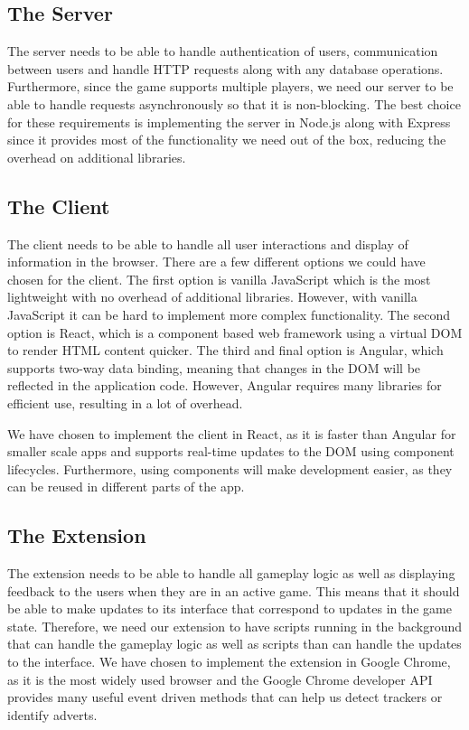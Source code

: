 \documentclass{l4proj}
\begin{document}
\subsection{The Server}
The server needs to be able to handle authentication of users, communication between users and handle HTTP requests along with any database operations. Furthermore, since the game supports multiple players, we need
our server to be able to handle requests asynchronously so that it is non-blocking. The best choice for these requirements is implementing the server in Node.js along with Express since it provides most of the functionality we need out of the box, reducing the overhead
on additional libraries.  

\subsection{The Client}
The client needs to be able to handle all user interactions and display of information in the browser. There are a few different options we could have chosen for the client. The first option is vanilla JavaScript which is the most lightweight
with no overhead of additional libraries. However, with vanilla JavaScript it can be hard to implement more complex functionality. The second option is React, which is a component based web framework using a virtual DOM to render HTML 
content quicker. The third and final option is Angular, which supports two-way data binding, meaning that changes in the DOM will be reflected in the application code. However, Angular requires many libraries for efficient use, resulting in a lot
of overhead.

We have chosen to implement the client in React, as it is faster than Angular for smaller scale apps and supports real-time updates to the DOM using component lifecycles. Furthermore, using components will make development easier, as they
can be reused in different parts of the app.

\subsection{The Extension}
The extension needs to be able to handle all gameplay logic as well as displaying feedback to the users when they are in an active game. This means that it should be able to make updates to its interface that correspond to updates in the game state.
Therefore, we need our extension to have scripts running in the background that can handle the gameplay logic as well as scripts than can handle the updates to the interface. We have chosen to implement the extension in Google Chrome, as it is the
most widely used browser and the Google Chrome developer API provides many useful event driven methods that can help us detect trackers or identify adverts.
\end{document}
